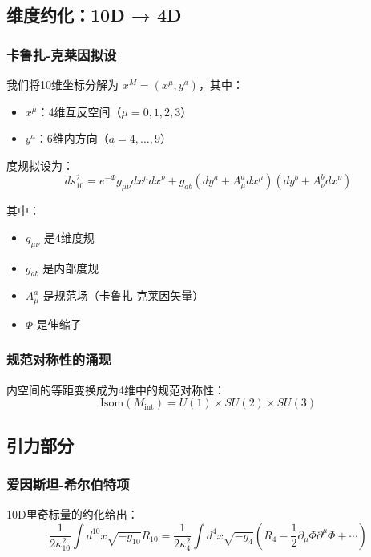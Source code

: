 \subsection{维度约化：10D → 4D}

\subsubsection{卡鲁扎-克莱因拟设}

我们将10维坐标分解为 $x^M = (x^\mu, y^a)$，其中：
\begin{itemize}
    \item $x^\mu$：4维互反空间（$\mu = 0,1,2,3$）
    \item $y^a$：6维内方向（$a = 4,\ldots,9$）
\end{itemize}

度规拟设为：
\begin{equation}
    ds_{10}^2 = e^{-\Phi}g_{\mu\nu}dx^\mu dx^\nu + g_{ab}(dy^a + A^a_\mu dx^\mu)(dy^b + A^b_\nu dx^\nu)
\end{equation}

其中：
\begin{itemize}
    \item $g_{\mu\nu}$ 是4维度规
    \item $g_{ab}$ 是内部度规
    \item $A^a_\mu$ 是规范场（卡鲁扎-克莱因矢量）
    \item $\Phi$ 是伸缩子
\end{itemize}

\subsubsection{规范对称性的涌现}

内空间的等距变换成为4维中的规范对称性：
\begin{equation}
    \text{Isom}(M_{\text{int}}) = U(1) \times SU(2) \times SU(3)
\end{equation}

\subsection{引力部分}

\subsubsection{爱因斯坦-希尔伯特项}

10D里奇标量的约化给出：
\begin{equation}
    \frac{1}{2\kappa_{10}^2}\int d^{10}x \sqrt{-g_{10}}R_{10} = \frac{1}{2\kappa_4^2}\int d^4x \sqrt{-g_4}\left(R_4 - \frac{1}{2}\partial_\mu\Phi\partial^\mu\Phi + \cdots\right)
\end{equation}

